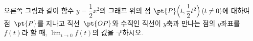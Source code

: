 \noindent\begin{minipage}[t]{0.58\linewidth}\vspace{0pt}\raggedright 오른쪽 그림과 같이 함수 $y=\dfrac{1}{2}x^2$의 그래프 위의 점 $\pt{P}\Big(t{,}\mkern3mu\mathopen{}\dfrac{1}{2}t^2\Big)\mkern3mu (t\ne0)$에 대하여 점~$\pt{P}$를 지나고 직선~$\pt{OP}$와 수직인 직선이 $y$축과 만나는 점의 $y$좌표를 $f(t)$라 할 때, $\displaystyle\lim_{t\to0}f(t)$의 값을 구하시오. \end{minipage}\hfill\begin{minipage}[t]{0.4\linewidth}\vspace{0pt}\centering \resizebox{\ifdim\width>\linewidth\linewidth\else\width\fi}{!}{}\end{minipage}\par
